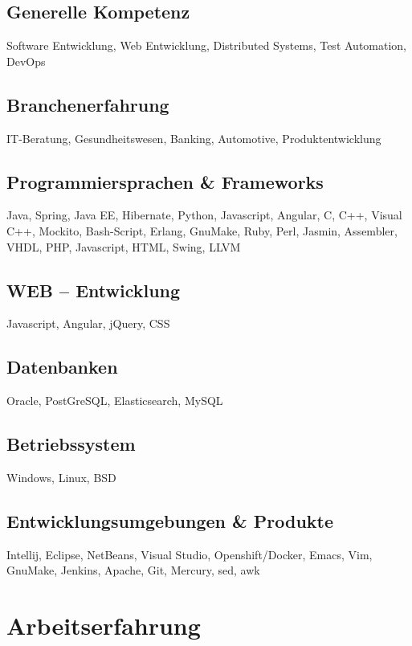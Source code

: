 \documentclass[fontsize=10pt]{tccv}
\begin{document}
\subsection{Generelle Kompetenz}
Software Entwicklung,
Web Entwicklung,
Distributed Systems,
Test Automation,
DevOps

\subsection{Branchenerfahrung}
IT-Beratung,
Gesundheitswesen,
Banking,
Automotive,
Produktentwicklung

\subsection{Programmiersprachen \& Frameworks}
Java, Spring, Java EE, Hibernate, Python, Javascript, Angular, C, C++, Visual C++,
Mockito, Bash-Script, Erlang, GnuMake, Ruby, Perl, Jasmin,
Assembler, VHDL, PHP, Javascript, HTML, Swing, LLVM

\subsection{WEB – Entwicklung}
Javascript, Angular, jQuery, CSS


\subsection{Datenbanken}
Oracle, PostGreSQL, Elasticsearch, MySQL

\subsection{Betriebssystem}
Windows, Linux, BSD

\subsection{Entwicklungsumgebungen \& Produkte}
Intellij, Eclipse, NetBeans, Visual Studio, Openshift/Docker, Emacs, Vim, GnuMake,
Jenkins, Apache, Git, Mercury, sed, awk

\section{Arbeitserfahrung}
\end{document}
